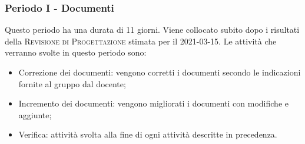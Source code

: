 \documentclass[../piano_di_progetto.tex]{subfiles}
\begin{document}


\subsubsection{Periodo I - Documenti}
Questo periodo ha una durata di 11 giorni. Viene collocato subito dopo i risultati della \textsc{Revisione di Progettazione} stimata per il 2021-03-15.
Le attività che verranno svolte in questo periodo sono:
\begin{itemize}
    \item Correzione dei documenti: vengono corretti i documenti secondo le indicazioni fornite al gruppo dal docente;
    \item Incremento dei documenti: vengono migliorati i documenti con modifiche e aggiunte;
    \item Verifica: attività svolta alla fine di ogni attività descritte in precedenza.
\end{itemize}
\end{document}
